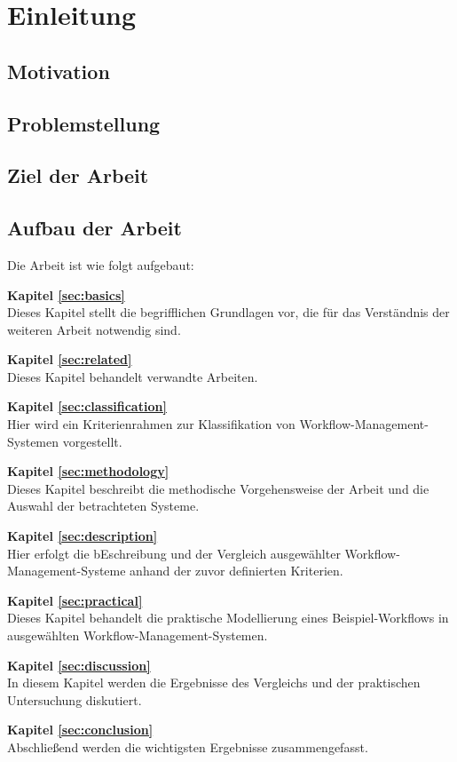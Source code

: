 %
\chapter{Einleitung}
\label{sec:intro}

\section{Motivation}
\label{sec:intro:motivation}

\section{Problemstellung}
\label{sec:intro:problem}

\section{Ziel der Arbeit}
\label{sec:intro:goal}

\section{Aufbau der Arbeit}
\label{sec:intro:structure}

Die Arbeit ist wie folgt aufgebaut:


\textbf{Kapitel \ref{sec:basics}} \\[0.2em]
Dieses Kapitel stellt die begrifflichen Grundlagen vor, die für das Verständnis der weiteren Arbeit notwendig sind.

\textbf{Kapitel \ref{sec:related}} \\[0.2em]
Dieses Kapitel behandelt verwandte Arbeiten.

\textbf{Kapitel \ref{sec:classification}} \\[0.2em]
Hier wird ein Kriterienrahmen zur Klassifikation von Workflow-Management-Systemen vorgestellt.

\textbf{Kapitel \ref{sec:methodology}} \\[0.2em]
Dieses Kapitel beschreibt die methodische Vorgehensweise der Arbeit und die Auswahl der betrachteten Systeme.

\textbf{Kapitel \ref{sec:description}} \\[0.2em]
Hier erfolgt die bEschreibung und der Vergleich ausgewählter Workflow-Management-Systeme anhand der zuvor definierten Kriterien.

\textbf{Kapitel \ref{sec:practical}} \\[0.2em]
Dieses Kapitel behandelt die praktische Modellierung eines Beispiel-Workflows in ausgewählten Workflow-Management-Systemen.

\textbf{Kapitel \ref{sec:discussion}} \\[0.2em]
In diesem Kapitel werden die Ergebnisse des Vergleichs und der praktischen Untersuchung diskutiert.

\textbf{Kapitel \ref{sec:conclusion}} \\[0.2em]
Abschließend werden die wichtigsten Ergebnisse zusammengefasst.